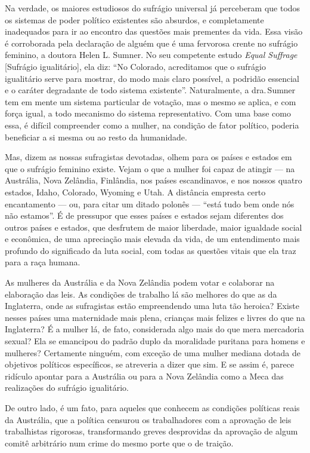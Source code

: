 Na verdade, os maiores estudiosos do sufrágio universal já perceberam
que todos os sistemas de poder político existentes são absurdos, e
completamente inadequados para ir ao encontro das questões mais
prementes da vida. Essa visão é corroborada pela declaração de alguém
que é uma fervorosa crente no sufrágio feminino, a doutora Helen L.
Sumner. No seu competente estudo \emph{Equal Suffrage}
{[}Sufrágio igualitário{]}, ela diz: ``No Colorado, acreditamos que o
sufrágio igualitário serve para mostrar, do modo mais claro possível, a
podridão essencial e o caráter degradante de todo sistema existente''.
Naturalmente, a dra.\,Sumner tem em mente um sistema particular de
votação, mas o mesmo se aplica, e com força igual, a todo mecanismo do
sistema representativo. Com uma base como essa, é difícil compreender
como a mulher, na condição de fator político, poderia beneficiar a si
mesma ou ao resto da humanidade.

Mas, dizem as nossas sufragistas devotadas, olhem para os países e
estados em que o sufrágio feminino existe. Vejam o que a mulher foi
capaz de atingir --- na Austrália, Nova Zelândia, Finlândia, nos países
escandinavos, e nos nossos quatro estados, Idaho, Colorado, Wyoming e
Utah. A distância empresta certo encantamento --- ou, para citar um
ditado polonês --- ``está tudo bem onde nós não estamos''. É de
pressupor que esses países e estados sejam diferentes dos outros países e estados, que desfrutem de maior liberdade, maior igualdade social e
econômica, de uma apreciação mais elevada da vida, de um entendimento
mais profundo do significado da luta social, com todas as questões
vitais que ela traz para a raça humana.

As mulheres da Austrália e da Nova Zelândia podem votar e colaborar na
elaboração das leis. As condições de trabalho lá são melhores do que as
da Inglaterra, onde as sufragistas estão empreendendo uma luta tão
heroica? Existe nesses países uma maternidade mais plena, crianças mais
felizes e livres do que na Inglaterra? É a mulher lá, de fato,
considerada algo mais do que mera mercadoria sexual? Ela se emancipou do
padrão duplo da moralidade puritana para homens e mulheres? Certamente
ninguém, com exceção de uma mulher mediana dotada de objetivos políticos
específicos, se atreveria a dizer que sim. E se assim é, parece ridículo
apontar para a Austrália ou para a Nova Zelândia como a Meca das
realizações do sufrágio igualitário.

De outro lado, é um fato, para aqueles que conhecem as condições
políticas reais da Austrália, que a política censurou os trabalhadores
com a aprovação de leis trabalhistas rigorosas, transformando greves
desprovidas da aprovação de algum comitê arbitrário num crime do mesmo
porte que o de traição.

